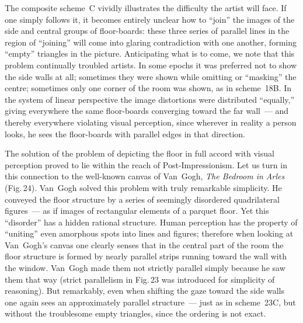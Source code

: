 The composite scheme~C vividly illustrates the difficulty the artist will face.  If one
simply follows it, it becomes entirely unclear how to ``join'' the images of the side and
central groups of floor-boards: these three series of parallel lines in the region of
``joining'' will come into glaring contradiction with one another, forming ``empty''
triangles in the picture.  Anticipating what is to come, we note that this problem
continually troubled artists.  In some epochs it was preferred not to show the side walls
at all; sometimes they were shown while omitting or ``masking'' the centre; sometimes
only one corner of the room was shown, as in scheme~18B.  In the system of linear
perspective the image distortions were distributed ``equally,'' giving everywhere the
same floor-boards converging toward the far wall~--- and thereby everywhere violating
visual perception, since wherever in reality a person looks, he sees the floor-boards with
parallel edges in that direction.


The solution of the problem of depicting the floor in full accord with visual perception
proved to lie within the reach of Post-Impressionism.  Let us turn in this connection to
the well-known canvas of Van~Gogh, \emph{The Bedroom in Arles} (Fig.\,24).  Van~Gogh
solved this problem with truly remarkable simplicity.  He conveyed the floor structure
by a series of seemingly disordered quadrilateral figures~--- as if images of rectangular
elements of a parquet floor.  Yet this ``disorder'' has a hidden rational structure.
Human perception has the property of ``uniting'' even amorphous spots into lines and
figures; therefore when looking at Van~Gogh's canvas one clearly senses that in the
central part of the room the floor structure is formed by nearly parallel strips running
toward the wall with the window.  Van~Gogh made them not strictly parallel simply
because he saw them that way (strict parallelism in Fig.\,23 was introduced for
simplicity of reasoning).  But remarkably, even when shifting the gaze toward the side
walls one again sees an approximately parallel structure~--- just as in scheme~23C,
but without the troublesome empty triangles, since the ordering is not exact.


